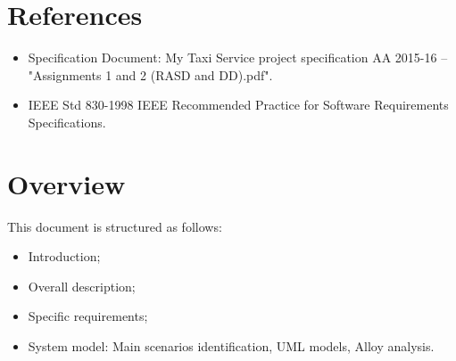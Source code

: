 \section{References}
\begin{itemize}

\item Specification Document: My Taxi Service project specification AA 2015-16 -- "Assignments 1 and 2 (RASD and DD).pdf".
\item IEEE Std 830-1998 IEEE Recommended Practice for Software Requirements Specifications.
\end{itemize}


\section{Overview}
This document is structured as follows:

\begin{itemize}

\item Introduction;
\item Overall description;
\item Specific requirements;
\item System model: Main scenarios identification, UML models, Alloy analysis.

\end{itemize}

